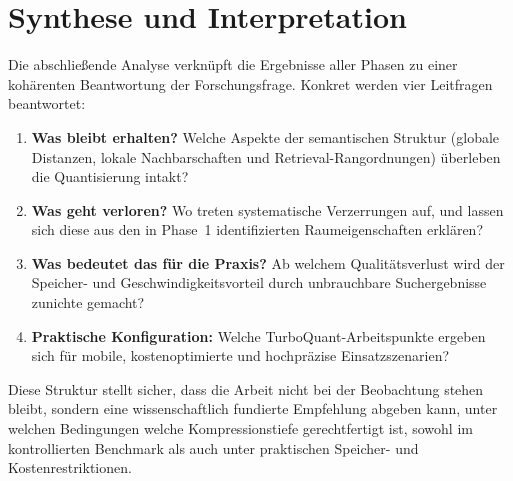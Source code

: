 \section{Synthese und Interpretation}
%
Die abschließende Analyse verknüpft die Ergebnisse aller Phasen zu einer kohärenten Beantwortung der Forschungsfrage.
%
Konkret werden vier Leitfragen beantwortet:
\begin{enumerate}
  \item \textbf{Was bleibt erhalten?} Welche Aspekte der semantischen Struktur (globale Distanzen, lokale Nachbarschaften und Retrieval-Rangordnungen) überleben die Quantisierung intakt?
  \item \textbf{Was geht verloren?} Wo treten systematische Verzerrungen auf, und lassen sich diese aus den in Phase~1 identifizierten Raumeigenschaften erklären?
  \item \textbf{Was bedeutet das für die Praxis?} Ab welchem Qualitätsverlust wird der Speicher- und Geschwindigkeitsvorteil durch unbrauchbare Suchergebnisse zunichte gemacht?
  \item \textbf{Praktische Konfiguration:} Welche TurboQuant-Arbeitspunkte ergeben sich für mobile, kostenoptimierte und hochpräzise Einsatzszenarien?
\end{enumerate}
%
Diese Struktur stellt sicher, dass die Arbeit nicht bei der Beobachtung stehen bleibt, sondern eine wissenschaftlich fundierte Empfehlung abgeben kann, unter welchen Bedingungen welche Kompressionstiefe gerechtfertigt ist, sowohl im kontrollierten Benchmark als auch unter praktischen Speicher- und Kostenrestriktionen.
